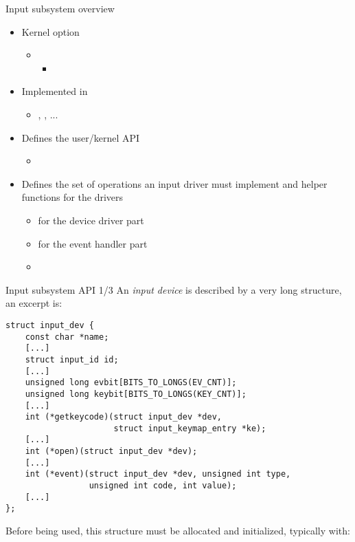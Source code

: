 \begin{frame}{Input subsystem overview}
  \begin{itemize}
  \item Kernel option 
    \begin{itemize}
    \item {}
      \begin{itemize}
      \item {}
      \end{itemize}
    \end{itemize}
  \item Implemented in 
    \begin{itemize}
    \item {},
          , ...
    \end{itemize}
  \item Defines the user/kernel API
    \begin{itemize}
    \item {}
    \end{itemize}
  \item Defines the set of operations an input driver must implement
    and helper functions for the drivers
    \begin{itemize}
    \item {} for the device driver part
    \item {} for the event handler part
    \item  {}
    \end{itemize}
  \end{itemize}
\end{frame}

\begin{frame}[fragile]{Input subsystem API 1/3}
  An {\em input device} is described by a very long
   structure, an excerpt is:
  \begin{block}{}
  \begin{verbatim}
struct input_dev {
    const char *name;
    [...]
    struct input_id id;
    [...]
    unsigned long evbit[BITS_TO_LONGS(EV_CNT)];
    unsigned long keybit[BITS_TO_LONGS(KEY_CNT)];
    [...]
    int (*getkeycode)(struct input_dev *dev,
                      struct input_keymap_entry *ke);
    [...]
    int (*open)(struct input_dev *dev);
    [...]
    int (*event)(struct input_dev *dev, unsigned int type,
                 unsigned int code, int value);
    [...]
};
\end{verbatim}
\end{block}
  Before being used, this structure must be allocated and
  initialized, typically with:
\end{frame}

